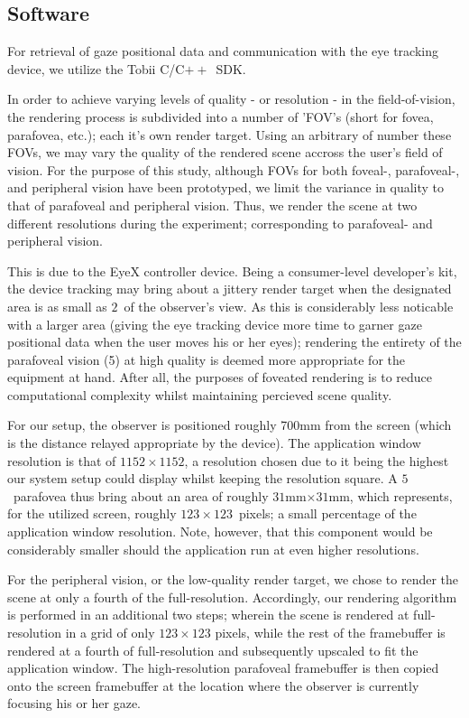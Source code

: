 \subsection{Software}
For retrieval of gaze positional data and communication with the eye tracking device, we utilize the Tobii C/C$++$~SDK.

In order to achieve varying levels of quality - or resolution - in the field-of-vision, the rendering process is subdivided into a number of 'FOV's (short for fovea, parafovea, etc.); each it's own render target.
Using an arbitrary of number these FOVs, we may vary the quality of the rendered scene accross the user's field of vision.
For the purpose of this study, although FOVs for both foveal-, parafoveal-, and peripheral vision have been prototyped, we limit the variance in quality to that of parafoveal and peripheral vision.
Thus, we render the scene at two different resolutions during the experiment; corresponding to parafoveal- and peripheral vision.

This is due to the EyeX controller device.
Being a consumer-level developer's kit, the device tracking may bring about a jittery render target when the designated area is as small as $2$\degree\ of the observer's view.
As this is considerably less noticable with a larger area (giving the eye tracking device more time to garner gaze positional data when the user moves his or her eyes); rendering the entirety of the parafoveal vision (5\degree ) at high quality is deemed more appropriate for the equipment at hand.
After all, the purposes of foveated rendering is to reduce computational complexity whilst maintaining percieved scene quality.

For our setup, the observer is positioned roughly 700mm from the screen (which is the distance relayed appropriate by the device).
The application window resolution is that of $1152\times 1152$, a resolution chosen due to it being the highest our system setup could display whilst keeping the resolution square.
A $5$\degree\ parafovea thus bring about an area of roughly $31$mm$\times $$31$mm, which represents, for the utilized screen, roughly $123\times 123$~pixels; a small percentage of the application window resolution.
Note, however, that this component would be considerably smaller should the application run at even higher resolutions.

For the peripheral vision, or the low-quality render target, we chose to render the scene at only a fourth of the full-resolution.
Accordingly, our rendering algorithm is performed in an additional two steps; wherein the scene is rendered at full-resolution in a grid of only $123\times 123$ pixels, while the rest of the framebuffer is rendered at a fourth of full-resolution and subsequently upscaled to fit the application window.
The high-resolution parafoveal framebuffer is then copied onto the screen framebuffer at the location where the observer is currently focusing his or her gaze.

